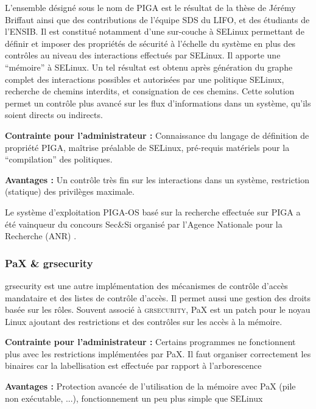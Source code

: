\documentclass[pdftex,a4paper,titlepage,11pt]{article}
\begin{document}
L'ensemble désigné sous le nom de PIGA est le résultat de la thèse de Jérémy Briffaut ainsi que des contributions de l'équipe SDS du LIFO, et des étudiants de l'ENSIB. Il est constitué notamment d'une sur-couche à SELinux permettant de définir et imposer des propriétés de sécurité à l'échelle du système en plus des contrôles au niveau des interactions effectués par SELinux. Il apporte une ``mémoire'' à SELinux. Un tel résultat est obtenu après génération du graphe complet des interactions possibles et autorisées par une politique SELinux, recherche de chemins interdits, et consignation de ces chemins. Cette solution permet un contrôle plus avancé sur les flux d'informations dans un système, qu'ils soient directs ou indirects.
\begin{list}{}{}
 \item \textbf{Contrainte pour l'administrateur :} Connaissance du langage de définition de propriété PIGA, maîtrise préalable de SELinux, pré-requis matériels pour la ``compilation'' des politiques.
 \item \textbf{Avantages :} Un contrôle très fin sur les interactions dans un système, restriction (statique) des privilèges maximale.
\end{list}

Le système d'exploitation PIGA-OS basé sur la recherche effectuée sur PIGA a été vainqueur du concours Sec\&Si organisé par l'Agence Nationale pour la Recherche (ANR) \cite{PIGASAINTMALO}\cite{PIGAPROP}.

\subsubsection{PaX \& grsecurity}

grsecurity est une autre implémentation des mécanismes de contrôle d'accès mandataire et des listes de contrôle d'accès. Il permet aussi une gestion des droits basée sur les rôles. Souvent associé à \textsc{grsecurity}, PaX est un patch pour le noyau Linux ajoutant des restrictions et des contrôles sur les accès à la mémoire.
\begin{list}{}{}
 \item \textbf{Contrainte pour l'administrateur :} Certains programmes ne fonctionnent plus avec les restrictions implémentées par PaX. Il faut organiser correctement les binaires car la labellisation est effectuée par rapport à l'arborescence
 \item \textbf{Avantages :} Protection avancée de l'utilisation de la mémoire avec PaX (pile non exécutable, ...), fonctionnement un peu plus simple que SELinux
\end{list}
\end{document}

